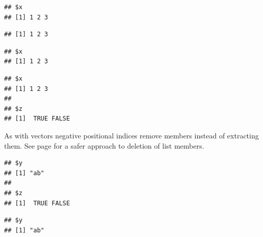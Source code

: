\documentclass[krantz2]{krantz}\usepackage{knitr}
\begin{document}
\begin{knitrout}\footnotesize
{}\color{fgcolor}\begin{kframe}
\begin{alltt}
\hlstd{a.list[}\hlstd{]}
\end{alltt}
\begin{verbatim}
## $x
## [1] 1 2 3
\end{verbatim}
\begin{alltt}
\hlopt{$}
\end{alltt}
\begin{verbatim}
## [1] 1 2 3
\end{verbatim}
\begin{alltt}
\hlstd{a.list[}\hlstd{]}
\end{alltt}
\begin{verbatim}
## $x
## [1] 1 2 3
\end{verbatim}
\begin{alltt}
\hlstd{a.list[}\hlstd{(}\hlstd{,} \hlstd{)]}
\end{alltt}
\begin{verbatim}
## $x
## [1] 1 2 3
## 
## $z
## [1]  TRUE FALSE
\end{verbatim}
\end{kframe}
\end{knitrout}

As with vectors negative positional indices remove members instead of extracting them. See page \pageref{par:calc:lists:rm} for a safer approach to deletion of list members.

\begin{knitrout}\footnotesize
{}\color{fgcolor}\begin{kframe}
\begin{alltt}
\hlstd{a.list[}\hlopt{-}\hlstd{]}
\end{alltt}
\begin{verbatim}
## $y
## [1] "ab"
## 
## $z
## [1]  TRUE FALSE
\end{verbatim}
\begin{alltt}
\hlstd{a.list[}\hlstd{(}\hlopt{-}\hlstd{,} \hlopt{-}\hlstd{)]}
\end{alltt}
\begin{verbatim}
## $y
## [1] "ab"
\end{verbatim}
\end{kframe}
\end{knitrout}
\end{document}
